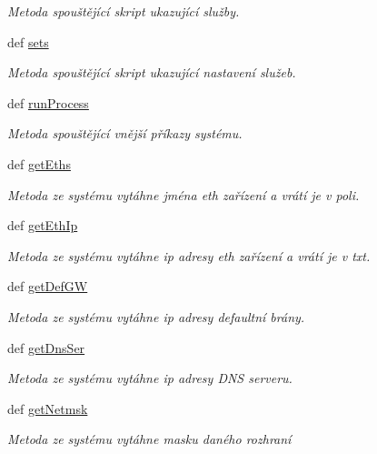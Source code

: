\begin{DoxyCompactItemize}
\begin{DoxyCompactList}\small\item\em Metoda spouštějící skript ukazující služby. \end{DoxyCompactList}\item 
def \hyperlink{classConsSys_1_1ConsSys_a5ede7c786f39d534aacace0fe599ffcb}{sets}
\begin{DoxyCompactList}\small\item\em Metoda spouštějící skript ukazující nastavení služeb. \end{DoxyCompactList}\item 
def \hyperlink{classConsSys_1_1ConsSys_ab74dd7930d406b91de35d324651bd92e}{run\-Process}
\begin{DoxyCompactList}\small\item\em Metoda spouštějící vnější příkazy systému. \end{DoxyCompactList}\item 
def \hyperlink{classConsSys_1_1ConsSys_a5bd98412b24730939bdfc10033ae0b51}{get\-Eths}
\begin{DoxyCompactList}\small\item\em Metoda ze systému vytáhne jména eth zařízení a vrátí je v poli. \end{DoxyCompactList}\item 
def \hyperlink{classConsSys_1_1ConsSys_a9d9dce75471df6c59b12c8e440e849d5}{get\-Eth\-Ip}
\begin{DoxyCompactList}\small\item\em Metoda ze systému vytáhne ip adresy eth zařízení a vrátí je v txt. \end{DoxyCompactList}\item 
def \hyperlink{classConsSys_1_1ConsSys_ab56242cf1d07da89a1bbdad369926f77}{get\-Def\-G\-W}
\begin{DoxyCompactList}\small\item\em Metoda ze systému vytáhne ip adresy defaultní brány. \end{DoxyCompactList}\item 
def \hyperlink{classConsSys_1_1ConsSys_aa4f9f92600aab89b6a70e72dbef258ee}{get\-Dns\-Ser}
\begin{DoxyCompactList}\small\item\em Metoda ze systému vytáhne ip adresy D\-N\-S serveru. \end{DoxyCompactList}\item 
def \hyperlink{classConsSys_1_1ConsSys_a73714b34e9344c67d2a9328f270376aa}{get\-Netmsk}
\begin{DoxyCompactList}\small\item\em Metoda ze systému vytáhne masku daného rozhraní \end{DoxyCompactList}\item 

\end{DoxyCompactItemize}
